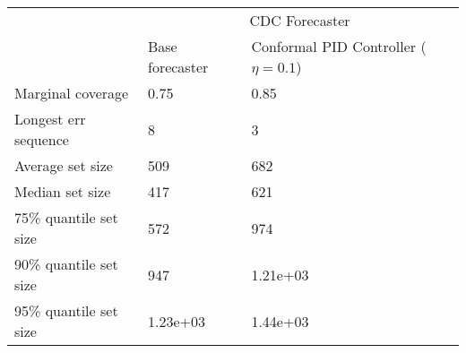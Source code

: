 \begin{tabular}{lll}
\toprule
& \multicolumn{2}{c}{CDC Forecaster} \\
& Base forecaster & Conformal PID Controller ($\eta=0.1$) \\
\midrule
Marginal coverage & 0.75 & 0.85 \\
Longest err sequence & 8 & 3 \\
Average set size & 509 & 682 \\
Median set size & 417 & 621 \\
75\% quantile set size & 572 & 974 \\
90\% quantile set size & 947 & 1.21e+03 \\
95\% quantile set size & 1.23e+03 & 1.44e+03 \\
\bottomrule
\end{tabular}
